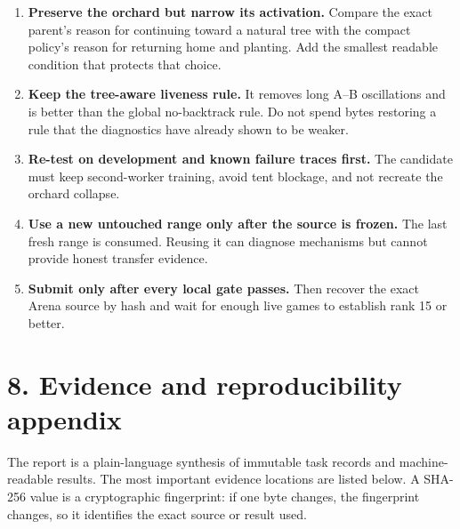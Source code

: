 \documentclass[10pt,a4paper]{article}
\begin{document}
\begin{enumerate}
\item \textbf{Preserve the orchard but narrow its activation.} Compare the exact parent's reason
for continuing toward a natural tree with the compact policy's reason for returning home and
planting. Add the smallest readable condition that protects that choice.
\item \textbf{Keep the tree-aware liveness rule.} It removes long A--B oscillations and is better
than the global no-backtrack rule. Do not spend bytes restoring a rule that the diagnostics have
already shown to be weaker.
\item \textbf{Re-test on development and known failure traces first.} The candidate must keep
second-worker training, avoid tent blockage, and not recreate the orchard collapse.
\item \textbf{Use a new untouched range only after the source is frozen.} The last fresh range is
consumed. Reusing it can diagnose mechanisms but cannot provide honest transfer evidence.
\item \textbf{Submit only after every local gate passes.} Then recover the exact Arena source by
hash and wait for enough live games to establish rank 15 or better.
\end{enumerate}

\section*{8. Evidence and reproducibility appendix}

The report is a plain-language synthesis of immutable task records and machine-readable results.
The most important evidence locations are listed below. A SHA-256 value is a cryptographic
fingerprint: if one byte changes, the fingerprint changes, so it identifies the exact source or
result used.
\end{document}
